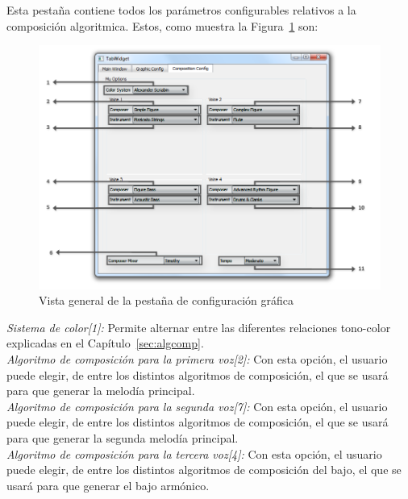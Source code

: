 		Esta pestaña contiene todos los parámetros configurables relativos a la composición algoritmica. Estos, como muestra la Figura~\ref{fig:interfazcomp} son:\\
		
		\begin{figure}[htbp]
		\centering
		\hspace*{-0.9in}
		\includegraphics[scale=0.57]{graphics/interfazcomp.png}
		\caption{Vista general de la pestaña de configuración gráfica}
		\label{fig:interfazcomp}
		\end{figure}
		
		\noindent\textit{Sistema de color[1]:} Permite alternar entre las diferentes relaciones tono-color explicadas en el Capítulo~\ref{sec:algcomp}.\\
		
		\noindent\textit{Algoritmo de composición para la primera voz[2]:} Con esta opción, el usuario puede elegir, de entre los distintos algoritmos de composición, el que se usará para que generar la melodía principal.\\
		
		\noindent\textit{Algoritmo de composición para la segunda voz[7]:} Con esta opción, el usuario puede elegir, de entre los distintos algoritmos de composición, el que se usará para que generar la segunda melodía principal.\\

		\noindent\textit{Algoritmo de composición para la tercera voz[4]:} Con esta opción, el usuario puede elegir, de entre los distintos algoritmos de composición del bajo, el que se usará para que generar el bajo armónico.\\
		
